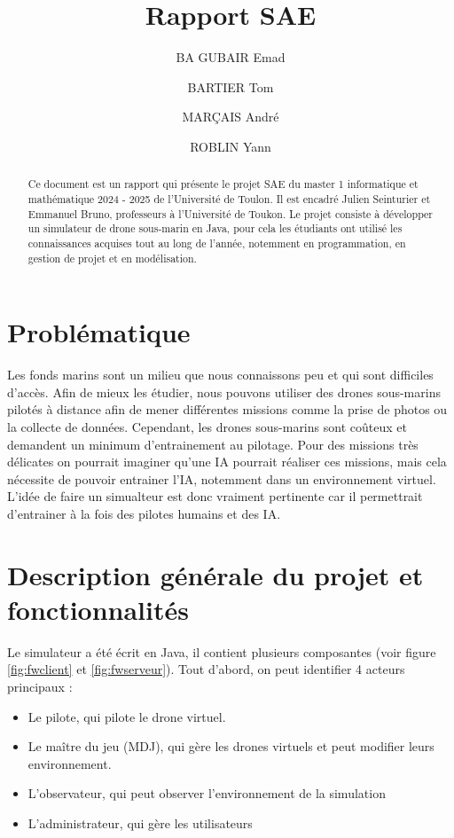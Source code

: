 \documentclass{scrartcl}
\title{Rapport SAE}
\author{BA GUBAIR Emad \and BARTIER Tom \and MARÇAIS André \and ROBLIN Yann}
\begin{document}
\maketitle{}

\begin{abstract}
    Ce document est un rapport qui présente le projet SAE du master 1 informatique et mathématique 2024 - 2025
    de l'Université de Toulon. Il est encadré Julien Seinturier et Emmanuel Bruno, professeurs à l'Université de Toukon.
    Le projet consiste à développer un simulateur de drone sous-marin en Java, pour cela les étudiants
    ont utilisé les connaissances acquises tout au long de l'année, notemment en programmation, en gestion de projet et
    en modélisation.
\end{abstract}

\section{Problématique}
Les fonds marins sont un milieu que nous connaissons peu et qui sont difficiles d'accès.
Afin de mieux les étudier, nous pouvons utiliser des drones sous-marins pilotés à distance
afin de mener différentes missions comme la prise de photos ou la collecte de données.
Cependant, les drones sous-marins sont coûteux et demandent un minimum d'entrainement au pilotage.
Pour des missions très délicates on pourrait imaginer qu'une IA pourrait réaliser ces missions, mais cela
nécessite de pouvoir entrainer l'IA, notemment dans un environnement virtuel. L'idée de faire un simualteur
est donc vraiment pertinente car il permettrait d'entrainer à la fois des pilotes humains et des IA.

\section {Description générale du projet et fonctionnalités}

Le simulateur a été écrit en Java, il contient plusieurs composantes (voir figure \ref{fig:fwclient} et \ref{fig:fwserveur}).
Tout d'abord, on peut identifier 4 acteurs principaux :
\begin{itemize}
    \item Le pilote, qui pilote le drone virtuel.
    \item Le maître du jeu (MDJ), qui gère les drones virtuels et peut modifier leurs environnement.
    \item L'observateur, qui peut observer l'environnement de la simulation
    \item L'administrateur, qui gère les utilisateurs
\end{itemize}
\end{document}
